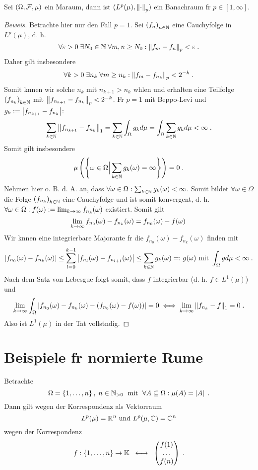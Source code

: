 \begin{theorem}
	Sei \((\Omega, \mathcal{F}, \mu)\) ein Ma\s raum, dann ist \((L^p(\mu), \left\lVert\cdot\right\rVert_{p})\) ein Banachraum f\us r \(p \in [1,\infty]\).
\end{theorem}
\begin{proof}[Beweis]
	Betrachte hier nur den Fall \(p = 1\). Sei \(\left (f_n\right )_{n\in \mathbb{N}}\) eine Cauchyfolge in \(L^p(\mu)\), d. h. 
	\[\forall \varepsilon> 0 \;\exists N_0 \in \mathbb{N} \;\forall m,n \geq N_0: \left\lVert f_m - f_n\right\rVert_{p} < \varepsilon\;.\]
	Daher gilt insbesondere
	\[\forall k > 0 \; \exists n_k \;\forall m \geq n_k : \left\lVert f_m - f_{n_k}\right\rVert_{p} < 2^{-k}\;.\]
	Somit k\os nnen wir solche \(n_k\) mit \(n_{k+1} > n_k\) w\as hlen und erhalten eine Teilfolge \(\left (f_{n_k}\right )_{k\in \mathbb{N}}\) mit \( \left\lVert f_{n_{k+1}} - f_{n_k}\right\rVert_{p} < 2^{-k}\). F\us r \(p = 1 \) mit Beppo-Levi und \(g_k:= \left\lvert f_{n_{k+1}} - f_{n_k} \right\rvert\):
	\[\sum_{k\in\mathbb{N}} \left\lVert f_{n_{k+1}} - f_{n_k}\right\rVert_{1} = \sum_{k\in\mathbb{N}} \int_\Omega g_k d\mu = \int_\Omega \sum_{k\in\mathbb{N}} g_k d\mu < \infty\;.\]
	Somit gilt insbesondere 
	\[\mu\left(\left\{\omega \in \Omega\Big\vert \sum_{k\in\mathbb{N}} g_k(\omega) = \infty\right\}\right) = 0\;.\]
	Nehmen hier o. B. d. A. an, dass \(\forall \omega \in \Omega: \sum_{k\in\mathbb{N}} g_k(\omega) <\infty\). Somit bildet \(\forall \omega\in\Omega\) die Folge \(\left (f_{n_k}\right )_{k\in \mathbb{N}}\) eine Cauchyfolge und ist somit konvergent, d. h. \(\forall \omega \in \Omega: f(\omega) := \lim_{k \to\infty} f_{n_k}(\omega)\) existiert. Somit gilt 
	\[\lim_{k \to\infty} f_{n_0}(\omega) - f_{n_k}(\omega) = f_{n_0}(\omega) - f(\omega)\;\]
	Wir k\os nnen eine integrierbare Majorante f\us r die $f_{n_0}(\omega) - f_{n_k}(\omega)$ finden mit 
	\[\left\lvert f_{n_0}(\omega) - f_{n_k}(\omega) \right\rvert \leq \sum_{l=0}^{k-1}\left\lvert f_{n_l}(\omega) - f_{n_{l+1}}(\omega) \right\rvert \leq \sum_{k\in\mathbb{N}} g_k(\omega) =: g(\omega) \text{ mit }\int_\Omega g d\mu < \infty\;.\]
	Nach dem Satz von Lebesgue folgt somit, dass $f$ integrierbar (d. h. \(f\in L^1(\mu)\)) und 
	\[\lim_{k \to\infty} \int_\Omega \left\lvert  f_{n_0}(\omega) - f_{n_k}(\omega) -( f_{n_0}(\omega) - f(\omega)) \right\rvert = 0 \iff \lim_{k \to\infty} \left\lVert f_{n_k} - f\right\rVert_{1} = 0 \;.\]
	Also ist \(L^1(\mu)\) in der Tat vollst\as ndig.
\end{proof}

\section{Beispiele f\us r normierte R\as ume}

\begin{ex}
	Betrachte 
	\[\Omega = \left\{1,\ldots, n\right\}, \; n\in\mathbb{N}_{>0} \;\text{ mit }\; \forall A \subseteq \Omega: \mu(A) = \left\lvert A \right\rvert\;.\] 
	Dann gilt wegen der Korrespondenz als Vektorraum
	\[L^p(\mu) = \mathbb{R}^n \text{ und } L^p(\mu, \mathbb{C}) = \mathbb{C}^n\]
	wegen der Korrespondenz 
	\[f:\left\{1,\ldots,n\right\} \to \mathbb{K} \;\;\longleftrightarrow\;\; \begin{pmatrix}f(1)\\ \ldots \\ f(n)\end{pmatrix}\;.\]
\end{ex}

